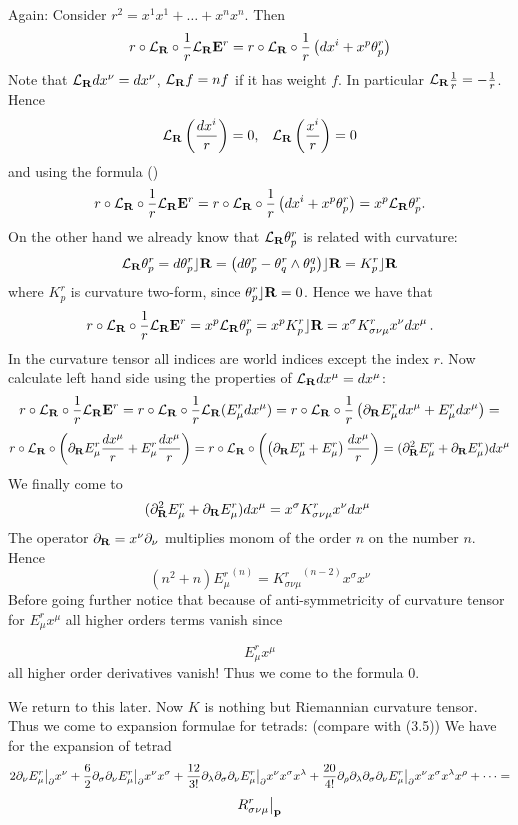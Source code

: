 Again:  Consider $r^2=x^1x^1+\dots+x^nx^n$. Then
           $$
r\circ{\cal L}_{\bf R}\circ {1\over r}{\cal L}_{\bf R} {\bf E}^r=r\circ{\cal L}_{\bf R}\circ {1\over r}\left(dx^i+x^p\theta^r_p\right)
           $$
Note that ${\cal L}_{\bf R} dx^\nu=dx^\nu$, ${\cal L}_{\bf R} f=nf$ if it has weight $f$. In particular ${\cal L}_{\bf R}{1\over r}=-{1\over r}$. Hence
                            $$
     {\cal L}_{\bf R}\left(dx^i\over r\right)=0,\,\,\,\,\,{\cal L}_{\bf R}\left(x^i\over r\right)=0
              $$
               and using the formula ()
              $$
 r\circ{\cal L}_{\bf R}\circ {1\over r}{\cal L}_{\bf R} {\bf E}^r=r\circ{\cal L}_{\bf R}\circ {1\over r}\left(dx^i+x^p\theta^r_p\right)=
 x^p{\cal L}_{\bf R} \theta^r_p.
              $$
On the other hand we already know that ${\cal L}_{\bf R}\theta^r_p$ is related with curvature:
              $$
      {\cal L}_{\bf R} \theta^r_p=d\theta^r_p\rfloor {\bf R}=
           \left(d\theta^r_p-\theta^r_q\wedge \theta^q_p\right)\rfloor {\bf R}=K^r_p\rfloor {\bf R}
              $$
where $K^r_p$ is curvature two-form, since $\theta^r_p\rfloor {\bf R}=0$. Hence we have that
                $$
                 r\circ{\cal L}_{\bf R}\circ {1\over r}{\cal L}_{\bf R} {\bf E}^r=
 x^p{\cal L}_{\bf R} \theta^r_p=x^pK^r_p\rfloor {\bf R}=x^\sigma K^r_{\sigma\nu\mu}x^\nu dx^\mu\,.
                $$
In the curvature tensor all indices are world indices except the index $r$.
Now calculate left hand side using the properties of ${\cal L}_{\bf R} dx^\mu=dx^\mu$:
      $$
r\circ{\cal L}_{\bf R}\circ {1\over r}{\cal L}_{\bf R} {\bf E}^r=r\circ{\cal L}_{\bf R}\circ {1\over r}{\cal L}_{\bf R} (E^r_\mu dx^\mu)=
r\circ{\cal L}_{\bf R}\circ {1\over r}\left(\partial_{\bf R} E^r_\mu dx^\mu+E^r_\mu dx^\mu\right)=
      $$
      $$
r\circ{\cal L}_{\bf R}\circ \left(\partial_{\bf R} E^r_\mu {dx^\mu\over r}+E^r_\mu {dx^\mu\over r}\right)=
r\circ{\cal L}_{\bf R}\circ \left(\left(\partial_{\bf R} E^r_\mu +E^r_\mu \right){dx^\mu\over r}\right)=
(\partial_{\bf R}^2E^r_\mu+\partial_{\bf R} E^r_\mu)dx^\mu
      $$
We finally come to
         $$
         (\partial_{\bf R}^2E^r_\mu+\partial_{\bf R} E^r_\mu)dx^\mu=x^\sigma K^r_{\sigma\nu\mu}x^\nu dx^\mu\
         $$
The operator $\partial_{\bf R}=x^\nu\partial_\nu$ multiplies monom of the order $n$ on the number $n$. Hence
             $$
             (n^2+n){E^r_\mu}^{(n)}={K^r_{\sigma\nu\mu}}^{(n-2)}x^\sigma x^\nu
             $$
Before going further notice that because of anti-symmetricity of curvature tensor
for  $E^r_\mu x^\mu$ all higher orders terms vanish since

         $$
       E^r_\mu x^\mu
         $$
all higher order derivatives vanish! Thus we come to the formula 0.

We return to this later. Now
$K$ is nothing but Riemannian curvature tensor.  Thus we come to expansion formulae for tetrads:
(compare with (3.5))
  We have for the expansion of tetrad
          $$
2 \partial_\nu E^r_\mu\big\vert_\partial x^\nu+{6\over 2}\partial_\sigma \partial_\nu E^r_\mu\big\vert_\partial x^\nu x^\sigma+
{12\over 3!}\partial_\lambda \partial_\sigma \partial_\nu E^r_\mu\big\vert_\partial x^\nu x^\sigma x^\lambda+
{20\over 4!}\partial_\rho \partial_\lambda \partial_\sigma \partial_\nu E^r_\mu\big\vert_\partial x^\nu x^\sigma x^\lambda x^\rho+\dots=
          $$
          $$
R^r_{\sigma\nu\mu}\big\vert_{\bf p}
          $$


